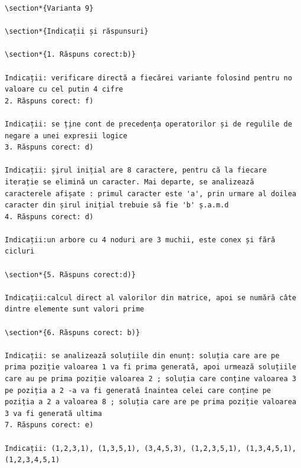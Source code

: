 \documentclass[10pt]{article}
\begin{document}
\begin{verbatim}
\section*{Varianta 9}

\section*{Indicații și răspunsuri}

\section*{1. Răspuns corect:b)}

Indicații: verificare directă a fiecărei variante folosind pentru no valoare cu cel putin 4 cifre
2. Răspuns corect: f)

Indicații: se ț̦ine cont de precedența operatorilor și de regulile de negare a unei expresii logice
3. Răspuns corect: d)

Indicații: ș̦irul inițial are 8 caractere, pentru că la fiecare iterație se elimină un caracter. Mai departe, se analizează caracterele afișate : primul caracter este 'a', prin urmare al doilea caracter din șirul inițial trebuie să fie 'b' ș.a.m.d
4. Răspuns corect: d)

Indicații:un arbore cu 4 noduri are 3 muchii, este conex și fără cicluri

\section*{5. Răspuns corect:d)}

Indicații:calcul direct al valorilor din matrice, apoi se numără câte dintre elemente sunt valori prime

\section*{6. Răspuns corect: b)}

Indicații: se analizează soluțiile din enunț: soluția care are pe prima poziție valoarea 1 va fi prima generată, apoi urmează soluțiile care au pe prima poziție valoarea 2 ; soluția care conține valoarea 3 pe poziția a 2 -a va fi generată înaintea celei care conține pe poziția a 2 a valoarea 8 ; soluția care are pe prima poziție valoarea 3 va fi generată ultima
7. Răspuns corect: e)

Indicații: (1,2,3,1), (1,3,5,1), (3,4,5,3), (1,2,3,5,1), (1,3,4,5,1), (1,2,3,4,5,1)


\end{verbatim}
\end{document}
